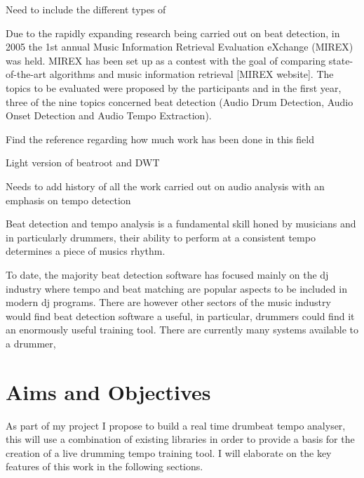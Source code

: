\documentclass[a4paper, 11pt]{article}
\begin{document}
Need to include the different types of 

Due to the rapidly expanding research being carried out on beat detection, in 2005 the 1st annual Music Information Retrieval Evaluation eXchange (MIREX) was held. MIREX has been set up as a contest with the goal of comparing state-of-the-art algorithms and music information retrieval [MIREX website]. The topics to be evaluated were proposed by the participants and in the first year, three of the nine topics concerned beat detection (Audio Drum Detection, Audio Onset Detection and Audio Tempo Extraction).  

Find the reference regarding how much work has been done in this field

Light version of beatroot and DWT

Needs to add history of all the work carried out on audio analysis with an emphasis on tempo detection

Beat detection and tempo analysis is a fundamental skill honed by musicians and in particularly drummers, their ability to perform at a consistent tempo determines a piece of musics rhythm. 

To date, the majority beat detection software has focused mainly on the dj industry where tempo and beat matching are popular aspects to be included in modern dj programs. There are however other sectors of the music industry would find beat detection software a useful, in particular, drummers could find it an enormously useful training tool. There are currently many systems available to a drummer, 




\subsection{}

\maketitle{} \section{Aims and Objectives}



As part of my project I propose to build a real time drumbeat tempo analyser, this will use a combination of existing libraries in order to provide a basis for the creation of a live drumming tempo training tool. I will elaborate on the key features of this work in the following sections.
\end{document}
